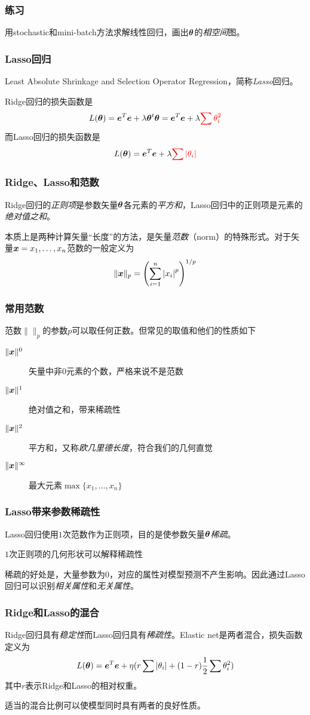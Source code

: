 \documentclass[14pt]{beamer}
\begin{document}
\begin{frame}
  \frametitle{练习}
  用stochastic和mini-batch方法求解线性回归，画出$\bm{\theta}$的\emph{相空间}图。
\end{frame}

\begin{frame}
  \frametitle{Lasso回归}
 Least Absolute Shrinkage and Selection Operator Regression，简称\emph{Lasso}回归。
 
 Ridge回归的损失函数是
 $$L(\bm{\theta})=\bm{e}^T\bm{e}+\lambda\bm{\theta}^t\bm{\theta}=\bm{e}^T\bm{e}+\lambda{\color{red}\sum\theta_i^2}$$
而Lasso回归的损失函数是
\begin{equation}
L(\bm{\theta})=\bm{e}^T\bm{e}+\lambda{\color{red}\sum|\theta_i|}
\end{equation}
\end{frame}

\begin{frame}
  \frametitle{Ridge、Lasso和范数}
  Ridge回归的\emph{正则项}是参数矢量$\bm{\theta}$各元素的\emph{平方和}，Lasso回归中的正则项是元素的\emph{绝对值之和}。

  本质上是两种计算矢量“长度”的方法，是矢量\emph{范数}（norm）的特殊形式。对于矢量$\bm{x}={x_1,\ldots,x_n}$范数的一般定义为
  \begin{equation}
    \|\bm{x}\|_p=\left(\sum_{i=1}^n{|x_i|}^p\right)^{1/p}
  \end{equation}
\end{frame}

\begin{frame}
  \frametitle{常用范数}
  范数$\|\|_p$的参数$p$可以取任何正数。但常见的取值和他们的性质如下
  \begin{description}
    \item[$\|\bm{x}\|^0$] 矢量中非0元素的个数，严格来说不是范数
    \item[$\|\bm{x}\|^1$] 绝对值之和，带来稀疏性
    \item[$\|\bm{x}\|^2$] 平方和，又称\emph{欧几里德长度}，符合我们的几何直觉
    \item[$\|\bm{x}\|^\infty$] 最大元素$\max\{x_1,\ldots,x_n\}$
  \end{description}
\end{frame}

\begin{frame}
  \frametitle{Lasso带来参数稀疏性}
  Lasso回归使用$1$次范数作为正则项，目的是使参数矢量$\bm{\theta}$\emph{稀疏}。

  $1$次正则项的几何形状可以解释稀疏性
  
  稀疏的好处是，大量参数为$0$，对应的属性对模型预测不产生影响。因此通过Lasso回归可以识别\emph{相关属性}和\emph{无关属性}。
\end{frame}

\begin{frame}
  \frametitle{Ridge和Lasso的混合}
  Ridge回归具有\emph{稳定性}而Lasso回归具有\emph{稀疏性}。Elastic net是两者混合，损失函数定义为
  \begin{equation}
    L(\bm{\theta})=\bm{e}^T\bm{e}+\eta(r\sum|\theta_i|+(1-r)\frac{1}{2}\sum\theta_i^2)
  \end{equation}
  其中$r$表示Ridge和Lasso的相对权重。

  适当的混合比例可以使模型同时具有两者的良好性质。
\end{frame}
\end{document}

